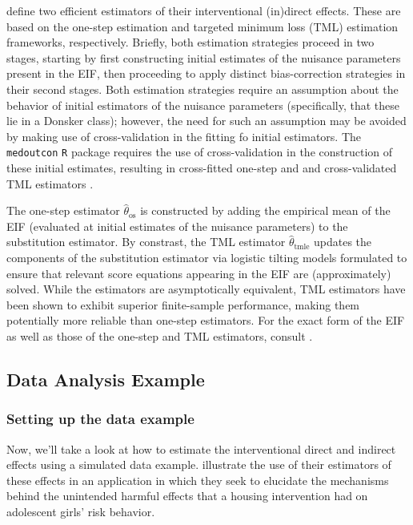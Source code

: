 \documentclass[
  12pt,
]{book}
\newcommand{\passthrough}[1]{#1}
\theoremstyle{definition}
\theoremstyle{definition}
\theoremstyle{definition}
\newcommand{\1}{\mathbbm{1}}
\begin{document}
\citet{diaz2020nonparametric} define two efficient estimators of their interventional
(in)direct effects. These are based on the one-step estimation and targeted
minimum loss (TML) estimation frameworks, respectively. Briefly, both estimation
strategies proceed in two stages, starting by first constructing initial
estimates of the nuisance parameters present in the EIF, then proceeding to
apply distinct bias-correction strategies in their second stages. Both
estimation strategies require an assumption about the behavior of initial
estimators of the nuisance parameters (specifically, that these lie in a Donsker
class); however, the need for such an assumption may be avoided by making use of
cross-validation in the fitting fo initial estimators. The \passthrough{\lstinline!medoutcon!} \passthrough{\lstinline!R!}
package requires the use of cross-validation in the construction of these
initial estimates, resulting in cross-fitted one-step and and cross-validated
TML estimators \citep{klaassen1987consistent, zheng2011cross, chernozhukov2018double}.

The one-step estimator \(\hat{\theta}_{\text{os}}\) is constructed by adding the
empirical mean of the EIF (evaluated at initial estimates of the nuisance
parameters) to the substitution estimator. By constrast, the TML estimator
\(\hat{\theta}_{\text{tmle}}\) updates the components of the substitution
estimator via logistic tilting models formulated to ensure that relevant score
equations appearing in the EIF are (approximately) solved. While the estimators
are asymptotically equivalent, TML estimators have been shown to exhibit
superior finite-sample performance, making them potentially more reliable than
one-step estimators. For the exact form of the EIF as well as those of the
one-step and TML estimators, consult \citet{diaz2020nonparametric}.

\hypertarget{data-analysis-example}{%
\subsection{Data Analysis Example}\label{data-analysis-example}}

\hypertarget{setting-up-the-data-example}{%
\subsubsection{Setting up the data example}\label{setting-up-the-data-example}}

Now, we'll take a look at how to estimate the interventional direct and indirect
effects using a simulated data example. \citet{diaz2020nonparametric} illustrate the
use of their estimators of these effects in an application in which they seek to
elucidate the mechanisms behind the unintended harmful effects that a housing
intervention had on adolescent girls' risk behavior.
\end{document}
